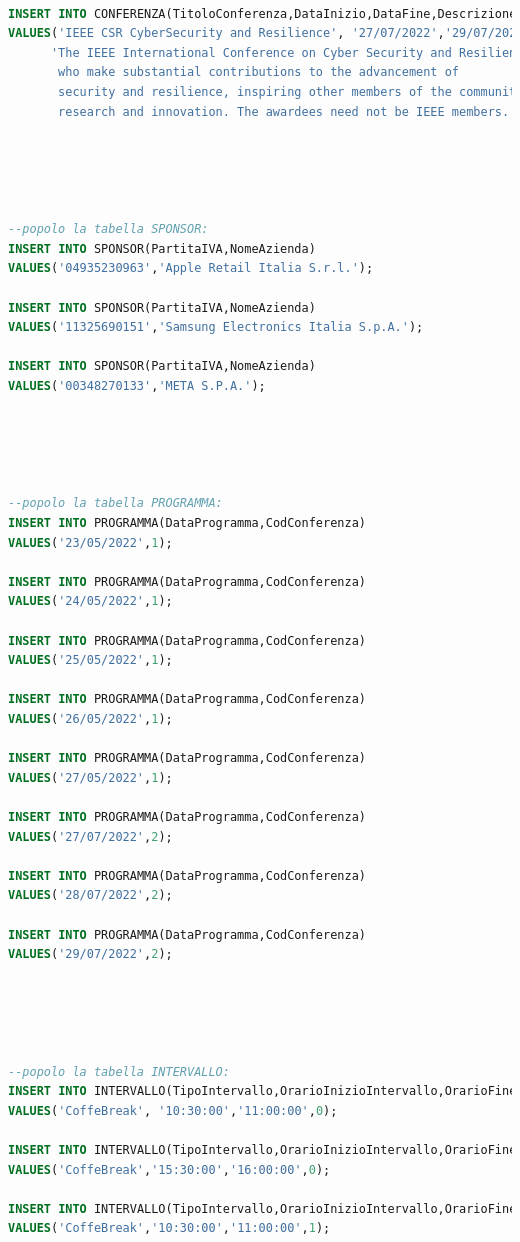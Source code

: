 \documentclass[a4page]{article}
\begin{document}
\begin{lstlisting}[language=SQL,
        deletekeywords={IDENTITY,INT},
        morekeywords={clustered},    
        framesep=10pt,
        framextopmargin=10pt]
   
INSERT INTO CONFERENZA(TitoloConferenza,DataInizio,DataFine,Descrizione,NomeSede)
VALUES('IEEE CSR CyberSecurity and Resilience', '27/07/2022','29/07/2022',
	  'The IEEE International Conference on Cyber Security and Resilience recognizes outstanding individuals
	   who make substantial contributions to the advancement of
	   security and resilience, inspiring other members of the community with their pioneering
	   research and innovation. The awardees need not be IEEE members.','monte sant''angelo');





--popolo la tabella SPONSOR:
INSERT INTO SPONSOR(PartitaIVA,NomeAzienda)
VALUES('04935230963','Apple Retail Italia S.r.l.');

INSERT INTO SPONSOR(PartitaIVA,NomeAzienda)
VALUES('11325690151','Samsung Electronics Italia S.p.A.');

INSERT INTO SPONSOR(PartitaIVA,NomeAzienda)
VALUES('00348270133','META S.P.A.');





--popolo la tabella PROGRAMMA:
INSERT INTO PROGRAMMA(DataProgramma,CodConferenza)
VALUES('23/05/2022',1);

INSERT INTO PROGRAMMA(DataProgramma,CodConferenza)
VALUES('24/05/2022',1);

INSERT INTO PROGRAMMA(DataProgramma,CodConferenza)
VALUES('25/05/2022',1);

INSERT INTO PROGRAMMA(DataProgramma,CodConferenza)
VALUES('26/05/2022',1);

INSERT INTO PROGRAMMA(DataProgramma,CodConferenza)
VALUES('27/05/2022',1);

INSERT INTO PROGRAMMA(DataProgramma,CodConferenza)
VALUES('27/07/2022',2);

INSERT INTO PROGRAMMA(DataProgramma,CodConferenza)
VALUES('28/07/2022',2);

INSERT INTO PROGRAMMA(DataProgramma,CodConferenza)
VALUES('29/07/2022',2);





--popolo la tabella INTERVALLO:
INSERT INTO INTERVALLO(TipoIntervallo,OrarioInizioIntervallo,OrarioFineIntervallo,CodProgramma)
VALUES('CoffeBreak', '10:30:00','11:00:00',0);

INSERT INTO INTERVALLO(TipoIntervallo,OrarioInizioIntervallo,OrarioFineIntervallo,CodProgramma)
VALUES('CoffeBreak','15:30:00','16:00:00',0);

INSERT INTO INTERVALLO(TipoIntervallo,OrarioInizioIntervallo,OrarioFineIntervallo,CodProgramma)
VALUES('CoffeBreak','10:30:00','11:00:00',1);


\end{lstlisting}
\end{document}
